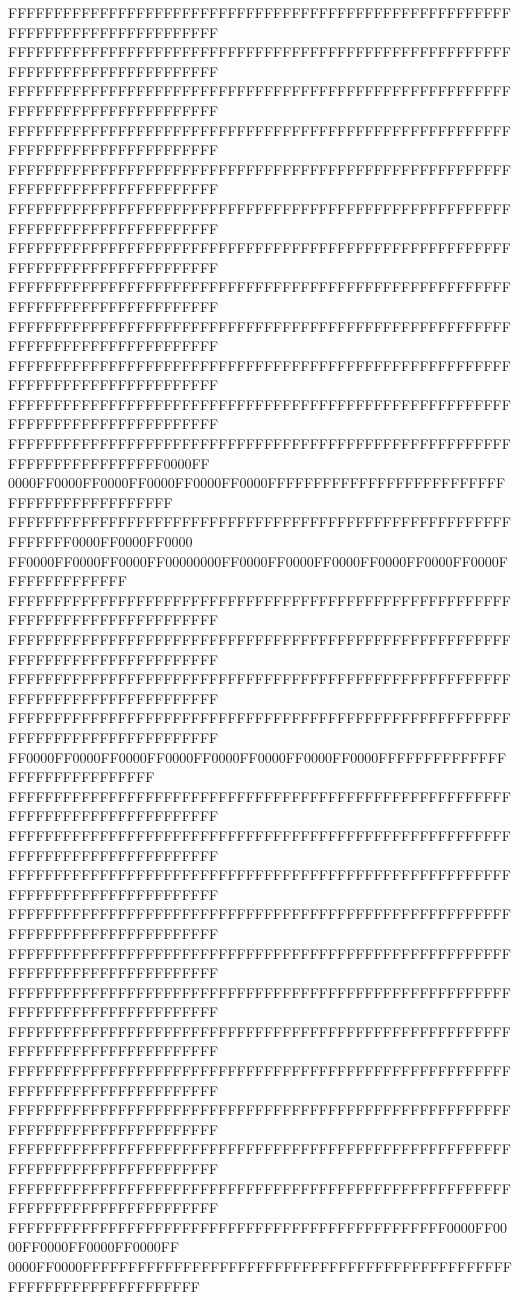 FFFFFFFFFFFFFFFFFFFFFFFFFFFFFFFFFFFFFFFFFFFFFFFFFFFFFFFFFFFFFFFFFFFFFFFFFFFFFF
FFFFFFFFFFFFFFFFFFFFFFFFFFFFFFFFFFFFFFFFFFFFFFFFFFFFFFFFFFFFFFFFFFFFFFFFFFFFFF
FFFFFFFFFFFFFFFFFFFFFFFFFFFFFFFFFFFFFFFFFFFFFFFFFFFFFFFFFFFFFFFFFFFFFFFFFFFFFF
FFFFFFFFFFFFFFFFFFFFFFFFFFFFFFFFFFFFFFFFFFFFFFFFFFFFFFFFFFFFFFFFFFFFFFFFFFFFFF
FFFFFFFFFFFFFFFFFFFFFFFFFFFFFFFFFFFFFFFFFFFFFFFFFFFFFFFFFFFFFFFFFFFFFFFFFFFFFF
FFFFFFFFFFFFFFFFFFFFFFFFFFFFFFFFFFFFFFFFFFFFFFFFFFFFFFFFFFFFFFFFFFFFFFFFFFFFFF
FFFFFFFFFFFFFFFFFFFFFFFFFFFFFFFFFFFFFFFFFFFFFFFFFFFFFFFFFFFFFFFFFFFFFFFFFFFFFF
FFFFFFFFFFFFFFFFFFFFFFFFFFFFFFFFFFFFFFFFFFFFFFFFFFFFFFFFFFFFFFFFFFFFFFFFFFFFFF
FFFFFFFFFFFFFFFFFFFFFFFFFFFFFFFFFFFFFFFFFFFFFFFFFFFFFFFFFFFFFFFFFFFFFFFFFFFFFF
FFFFFFFFFFFFFFFFFFFFFFFFFFFFFFFFFFFFFFFFFFFFFFFFFFFFFFFFFFFFFFFFFFFFFFFFFFFFFF
FFFFFFFFFFFFFFFFFFFFFFFFFFFFFFFFFFFFFFFFFFFFFFFFFFFFFFFFFFFFFFFFFFFFFFFFFFFFFF
FFFFFFFFFFFFFFFFFFFFFFFFFFFFFFFFFFFFFFFFFFFFFFFFFFFFFFFFFFFFFFFFFFFFFFFF0000FF
0000FF0000FF0000FF0000FF0000FF0000FFFFFFFFFFFFFFFFFFFFFFFFFFFFFFFFFFFFFFFFFFFF
FFFFFFFFFFFFFFFFFFFFFFFFFFFFFFFFFFFFFFFFFFFFFFFFFFFFFFFFFFFFFF0000FF0000FF0000
FF0000FF0000FF0000FF00000000FF0000FF0000FF0000FF0000FF0000FF0000FFFFFFFFFFFFFF
FFFFFFFFFFFFFFFFFFFFFFFFFFFFFFFFFFFFFFFFFFFFFFFFFFFFFFFFFFFFFFFFFFFFFFFFFFFFFF
FFFFFFFFFFFFFFFFFFFFFFFFFFFFFFFFFFFFFFFFFFFFFFFFFFFFFFFFFFFFFFFFFFFFFFFFFFFFFF
FFFFFFFFFFFFFFFFFFFFFFFFFFFFFFFFFFFFFFFFFFFFFFFFFFFFFFFFFFFFFFFFFFFFFFFFFFFFFF
FFFFFFFFFFFFFFFFFFFFFFFFFFFFFFFFFFFFFFFFFFFFFFFFFFFFFFFFFFFFFFFFFFFFFFFFFFFFFF
FF0000FF0000FF0000FF0000FF0000FF0000FF0000FF0000FFFFFFFFFFFFFFFFFFFFFFFFFFFFFF
FFFFFFFFFFFFFFFFFFFFFFFFFFFFFFFFFFFFFFFFFFFFFFFFFFFFFFFFFFFFFFFFFFFFFFFFFFFFFF
FFFFFFFFFFFFFFFFFFFFFFFFFFFFFFFFFFFFFFFFFFFFFFFFFFFFFFFFFFFFFFFFFFFFFFFFFFFFFF
FFFFFFFFFFFFFFFFFFFFFFFFFFFFFFFFFFFFFFFFFFFFFFFFFFFFFFFFFFFFFFFFFFFFFFFFFFFFFF
FFFFFFFFFFFFFFFFFFFFFFFFFFFFFFFFFFFFFFFFFFFFFFFFFFFFFFFFFFFFFFFFFFFFFFFFFFFFFF
FFFFFFFFFFFFFFFFFFFFFFFFFFFFFFFFFFFFFFFFFFFFFFFFFFFFFFFFFFFFFFFFFFFFFFFFFFFFFF
FFFFFFFFFFFFFFFFFFFFFFFFFFFFFFFFFFFFFFFFFFFFFFFFFFFFFFFFFFFFFFFFFFFFFFFFFFFFFF
FFFFFFFFFFFFFFFFFFFFFFFFFFFFFFFFFFFFFFFFFFFFFFFFFFFFFFFFFFFFFFFFFFFFFFFFFFFFFF
FFFFFFFFFFFFFFFFFFFFFFFFFFFFFFFFFFFFFFFFFFFFFFFFFFFFFFFFFFFFFFFFFFFFFFFFFFFFFF
FFFFFFFFFFFFFFFFFFFFFFFFFFFFFFFFFFFFFFFFFFFFFFFFFFFFFFFFFFFFFFFFFFFFFFFFFFFFFF
FFFFFFFFFFFFFFFFFFFFFFFFFFFFFFFFFFFFFFFFFFFFFFFFFFFFFFFFFFFFFFFFFFFFFFFFFFFFFF
FFFFFFFFFFFFFFFFFFFFFFFFFFFFFFFFFFFFFFFFFFFFFFFFFFFFFFFFFFFFFFFFFFFFFFFFFFFFFF
FFFFFFFFFFFFFFFFFFFFFFFFFFFFFFFFFFFFFFFFFFFFFFFF0000FF0000FF0000FF0000FF0000FF
0000FF0000FFFFFFFFFFFFFFFFFFFFFFFFFFFFFFFFFFFFFFFFFFFFFFFFFFFFFFFFFFFFFFFFFFFF
